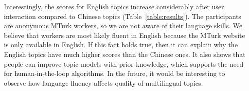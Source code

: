 Interestingly, the scores for English topics increase considerably after user interaction compared to Chinese topics (Table~\ref{table:results}).  The participants are anonymous MTurk workers, so we are not aware of their language skills.  We believe that workers are most likely fluent in English because the MTurk website is only available in English.  If this fact holds true, then it can explain why the English topics have much higher scores than the Chinese ones.  It also shows that people can improve topic models with prior knowledge, which supports the need for human-in-the-loop algorithms.  In the future, it would be interesting to observe how language fluency affects quality of multilingual topics. 


